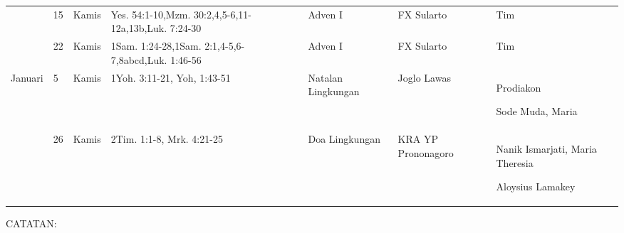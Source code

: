 \begin{flushleft}
\begin{longtable}{|m{1.2cm}|m{0.4cm}|m{0.9cm}|m{2.6cm}|m{2.1cm}|m{1.5cm}|m{3.1cm}|}
& 15& Kamis& Yes. 54:1-10,Mzm. 30:2,4,5-6,11-12a,13b,Luk. 7:24-30& Adven I& FX Sularto& Tim\par \\ 	\cline{2-7}
& 22& Kamis& 1Sam. 1:24-28,1Sam. 2:1,4-5,6-7,8abcd,Luk. 1:46-56& Adven I& FX Sularto& Tim\par \\ 	\hline
Januari& 5& Kamis& 1Yoh. 3:11-21, Yoh, 1:43-51& Natalan Lingkungan& Joglo Lawas& Prodiakon\par Sode Muda, Maria\\ 	\cline{2-7}
& 26& Kamis& 2Tim. 1:1-8, Mrk. 4:21-25& Doa Lingkungan& KRA YP Prononagoro& Nanik Ismarjati, Maria Theresia\par Aloysius Lamakey\\ 	\hline
\end{longtable}
\normalsize
\end{flushleft}
CATATAN:

